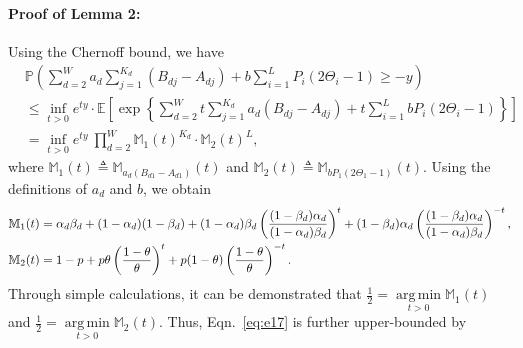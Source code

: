 \documentclass{article}
\DeclareMathOperator*{\argmin}{arg\,min}
\newcommand\af{\alpha_d}
\newcommand\bt{\beta_d}
\begin{document}
 \paragraph{Proof of Lemma 2:}  
    Using the Chernoff bound, we have
        \begin{align}
        & \mathbb{P} \left( \sum_{d=2}^{W} a_d  \sum_{j=1}^{K_d} (B_{dj} - A_{dj}) + b \sum_{i=1}^{L}P_i(2\Theta_i - 1) \geq -y  \right) \\
        & \leq\inf \limits_{t>0} e^{ty} \cdot \mathbb{E}\left[ \exp \left\{ \sum_{d=2}^{W} t   \sum_{j=1}^{K_d} a_d (B_{dj} - A_{dj}) + t  \sum_{i=1}^{L}b P_i(2\Theta_i - 1) \right\} \right] \\
        & = \inf \limits_{t>0} e^{ty} \ \prod_{d=2}^{W} \mathbb{M}_{1}(t)^{K_d} \cdot \mathbb{M}_{2} (t)^{L}, \label{eq:e17}
        \end{align}
	where $\mathbb{M}_1(t) \triangleq \mathbb{M}_{a_d(B_{d1}-A_{d1})}(t)$ and  $\mathbb{M}_2(t) \triangleq \mathbb{M}_{bP_1(2\Theta_1 - 1)}(t)$. Using the definitions of $a_d$ and $b$, we obtain 
 \begin{align}
     &\mathbb{M}_1(t) = \af \bt + (1-\af)(1-\bt) + (1-\af)\bt \left( \frac{(1-\bt)\af  }{(1-\af )\bt  }  \right)^{t} + (1-\bt )\af \left( \frac{(1-\bt )\af  }{(1-\af )\bt  }  \right)^{-t}, \notag \\
     &\mathbb{M}_2(t)  = 1-p + p\theta \left( \frac{1-\theta}{\theta} \right)^t + p(1-\theta)\left( \frac{1-\theta}{\theta} \right)^{-t}. \notag
 \end{align}
	Through simple calculations, it can be demonstrated that
	$\frac{1}{2} = \argmin \limits_{t>0} \mathbb{M}_{1}(t) $ and $\frac{1}{2} = \argmin \limits_{t>0} \mathbb{M}_{2}(t)$. Thus, Eqn.~\eqref{eq:e17} is further upper-bounded by
\end{document}
